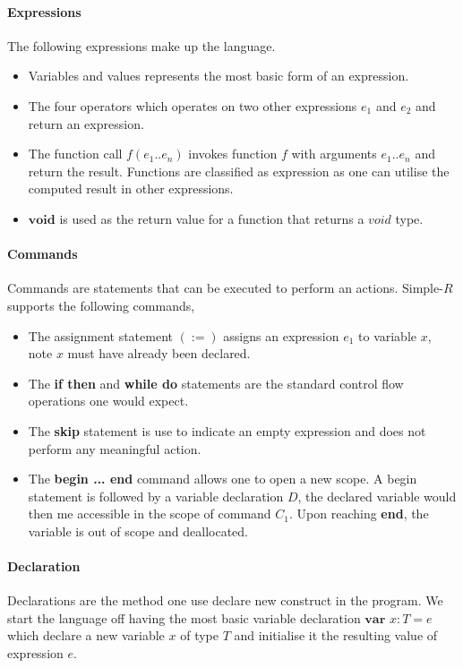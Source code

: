 \documentclass[a4paper,12pt]{report}
\begin{document}
\paragraph{Expressions} The following expressions make up the language.
\begin{itemize}
  \item Variables and values represents the most basic form of an expression.
  \item The four operators which operates on two other expressions $e_1$ 
  and $e_2$ and return an expression.
  \item The function call $f(e_1..e_n)$ invokes function $f$ with arguments 
  $e_1..e_n$ and return the result. Functions are classified as expression as 
  one can utilise the computed result in other expressions. 
  \item $\textbf{void}$ is used as the return value for a function that returns 
  a $void$ type.
\end{itemize}

\paragraph{Commands} Commands are statements that can be executed to perform an 
actions. Simple-$R$ supports the following commands,
\begin{itemize}
  \item The assignment statement $(:=)$ assigns an expression $e_1$ to variable 
  $x$, note $x$ must have already been declared. 
  \item The \textbf{if then} and \textbf{while do} statements are the standard 
  control flow operations one would expect.
  \item The \textbf{skip} statement is use to indicate an empty expression and 
  does not perform any meaningful action. 
  \item The \textbf{begin ... end} command allows one to open a new scope. A 
  begin statement is followed by a variable declaration $D$, the declared 
  variable would then me accessible in the scope of command $C_1$. Upon reaching 
  \textbf{end}, the variable is out of scope and deallocated. 
\end{itemize}

\paragraph{Declaration} Declarations are the method one use declare new construct 
in the program. We start the language off having the most basic variable declaration 
$\textbf{var }x : T = e$ which declare a new variable $x$ of type $T$ and 
initialise it the resulting value of expression $e$.
\end{document}

